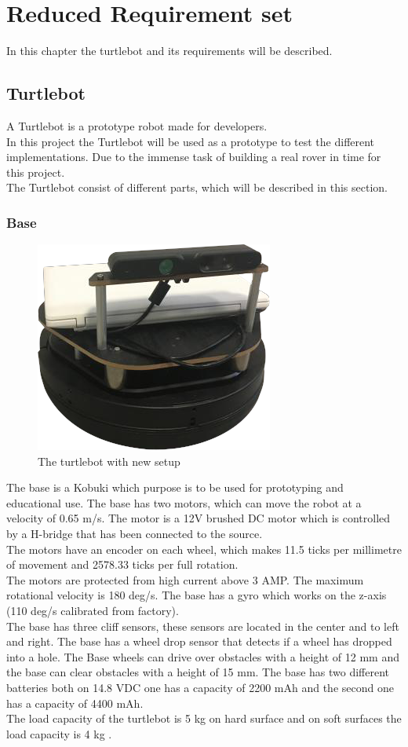 \chapter{Reduced Requirement set} \label{ch:Reduced Requirement Set}
In this chapter the turtlebot and its requirements will be described.

\section{Turtlebot} %
A Turtlebot is a prototype robot made for developers.\\
In this project the Turtlebot will be used as a prototype to test the different implementations. Due to the immense task of building a real rover in time for this project.\\
The Turtlebot consist of different parts, which will be described in this section.

\subsection{Base} %
\begin{figure}[h]
    \centering
    \includegraphics[width=.5\textwidth]{figures/turtlebot001.png}
    \caption{The turtlebot with new setup} 
    \label{fig:turtlebot} 
\end{figure}
The base is a Kobuki which purpose is to be used for prototyping and educational use. The base has two motors, which can move the robot at a velocity of 0.65 m/s. The motor is a 12V brushed DC motor which is controlled by a H-bridge that has been connected to the source.\\
The motors have an encoder on each wheel, which makes 11.5 ticks per millimetre of movement and 2578.33 ticks per full rotation.\\
The motors are protected from high current above 3 AMP. The maximum rotational velocity is 180 deg/s. The base has a gyro which works on the z-axis (110 deg/s calibrated from factory).\\
The base has three cliff sensors, these sensors are located in the center and to left and right. The base has a wheel drop sensor that detects if a wheel has dropped into a hole. The Base wheels can drive over obstacles with a height of 12 mm and the base can clear obstacles with a height of 15 mm. The base has two different batteries both on 14.8 VDC one has a capacity of 2200 mAh and the second one has a capacity of 4400 mAh.\\ 
The load capacity of the turtlebot is 5 kg on hard surface and on soft surfaces the load capacity is 4 kg \cite{Base}.

